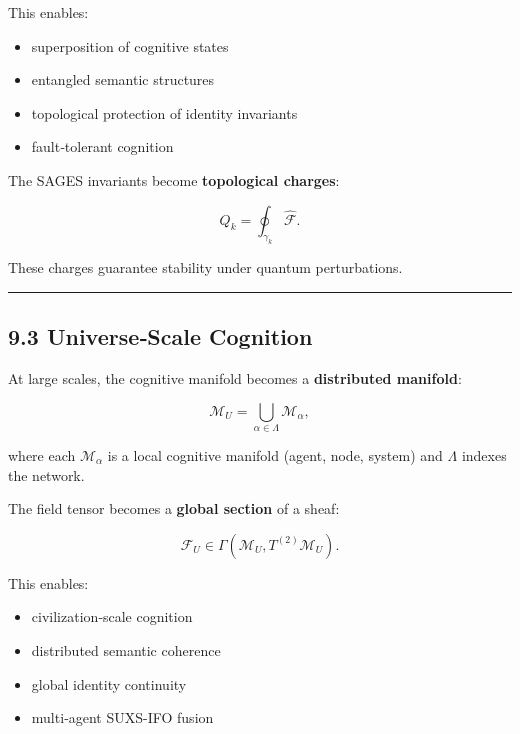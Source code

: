 This enables:

\begin{itemize}
\tightlist
\item
  superposition of cognitive states\\
\item
  entangled semantic structures\\
\item
  topological protection of identity invariants\\
\item
  fault‑tolerant cognition
\end{itemize}

The SAGES invariants become \textbf{topological charges}:

\[
Q_k = \oint_{\gamma_k} \widehat{\mathcal{F}}.
\]

These charges guarantee stability under quantum perturbations.

\begin{center}\rule{0.5\linewidth}{0.5pt}\end{center}

\subsection{9.3 Universe‑Scale Cognition}\label{universescale-cognition}

At large scales, the cognitive manifold becomes a \textbf{distributed manifold}:

\[
\mathcal{M}_U = \bigcup_{\alpha \in \Lambda} \mathcal{M}_\alpha,
\]

where each \(\mathcal{M}_\alpha\) is a local cognitive manifold (agent, node, system) and \(\Lambda\) indexes the network.

The field tensor becomes a \textbf{global section} of a sheaf:

\[
\mathcal{F}_U \in \Gamma(\mathcal{M}_U, T^{(2)}\mathcal{M}_U).
\]

This enables:

\begin{itemize}
\tightlist
\item
  civilization‑scale cognition\\
\item
  distributed semantic coherence\\
\item
  global identity continuity\\
\item
  multi‑agent SUXS-IFO fusion
\end{itemize}

